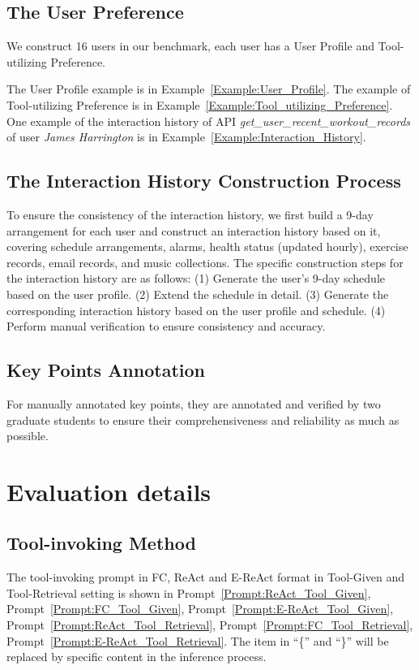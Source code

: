 \documentclass[11pt]{article}
\begin{document}
\subsection{The User Preference}
We construct 16 users in our benchmark, each user has a User Profile and Tool-utilizing Preference.

The User Profile example is in Example~\ref{Example:User_Profile}. The example of Tool-utilizing Preference is in Example~\ref{Example:Tool_utilizing_Preference}. One example of the interaction history of API \textit{get\_user\_recent\_workout\_records} of user \textit{James Harrington} is in Example~\ref{Example:Interaction_History}.



\subsection{The Interaction History Construction Process}
\label{sec:appendix_instruction_history}
To ensure the consistency of the interaction history, we first build a 9-day arrangement for each user and construct an interaction history based on it, covering schedule arrangements, alarms, health status (updated hourly), exercise records, email records, and music collections. The specific construction steps for the interaction history are as follows: (1)	Generate the user’s 9-day schedule based on the user profile. (2)	Extend the schedule in detail. (3)	Generate the corresponding interaction history based on the user profile and schedule. (4)	Perform manual verification to ensure consistency and accuracy.

\subsection{Key Points Annotation}
For manually annotated key points, they are annotated and verified by two graduate students to ensure their comprehensiveness and reliability as much as possible.

\section{Evaluation details}
\label{sec:evaluation_details}

\subsection{Tool-invoking Method}
The tool-invoking prompt in FC, ReAct and E-ReAct format in Tool-Given and Tool-Retrieval setting is shown in Prompt~\ref{Prompt:ReAct_Tool_Given}, Prompt~\ref{Prompt:FC_Tool_Given}, Prompt~\ref{Prompt:E-ReAct_Tool_Given}, Prompt~\ref{Prompt:ReAct_Tool_Retrieval}, Prompt~\ref{Prompt:FC_Tool_Retrieval}, Prompt~\ref{Prompt:E-ReAct_Tool_Retrieval}. The item in ``\{'' and ``\}'' will be replaced by specific content in the inference process.
\end{document}
